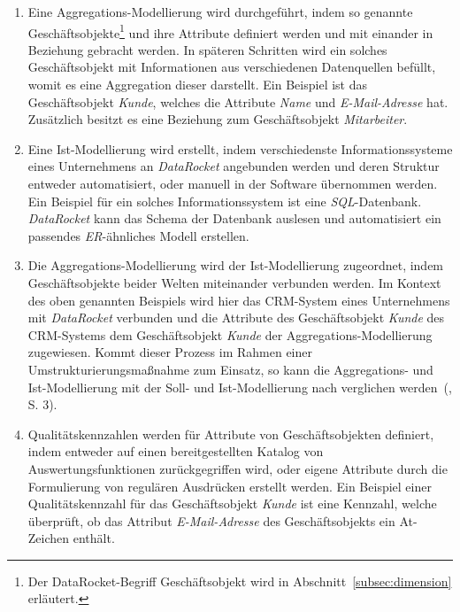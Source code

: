 \documentclass[
  language=german, %
  type=bachelor%
]{isthesis}
\begin{document}
\begin{content}
	\begin{enumerate}
		\item Eine Aggregations-Modellierung wird durchgeführt, indem so genannte
		Geschäftsobjekte\footnote{Der DataRocket-Begriff Geschäftsobjekt wird in
		Abschnitt~\ref{subsec:dimension} erläutert.} und ihre Attribute definiert
		werden und mit einander in Beziehung gebracht werden. In späteren Schritten
		wird ein solches Geschäftsobjekt mit Informationen aus verschiedenen
		Datenquellen befüllt, womit es eine Aggregation dieser darstellt. Ein
		Beispiel ist das Geschäftsobjekt \textit{Kunde}, welches die Attribute
		\textit{Name} und \textit{E-Mail-Adresse} hat. Zusätzlich besitzt es eine
		Beziehung zum Geschäftsobjekt \textit{Mitarbeiter}. 

    \item Eine Ist-Modellierung wird erstellt, indem verschiedenste
      Informationssysteme eines Unternehmens an \textit{DataRocket} angebunden
      werden und deren Struktur entweder automatisiert, oder manuell in der
			Software übernommen werden. Ein Beispiel für ein solches
			Informationssystem ist eine \textit{SQL}-Datenbank. \textit{DataRocket}
			kann das Schema der Datenbank auslesen und automatisiert ein passendes
			\textit{\acrshort{ER}}-ähnliches Modell erstellen.

		\item Die Aggregations-Modellierung wird der Ist-Modellierung zugeordnet,
		indem Geschäftsobjekte beider Welten miteinander verbunden werden. Im
		Kontext des oben genannten Beispiels wird hier das \acrshort{CRM}-System
		eines Unternehmens mit \textit{DataRocket} verbunden und die Attribute des
		Geschäftsobjekt \textit{Kunde} des \acrshort{CRM}-Systems dem
		Geschäftsobjekt \textit{Kunde} der Aggregations-Modellierung zugewiesen.
		Kommt dieser Prozess \zB{} im Rahmen einer Umstrukturierungsmaßnahme
		zum Einsatz, so kann die Aggregations- und Ist-Modellierung mit der Soll-
		und Ist-Modellierung nach \textsc{\citeauthor{becker2006konzeptionelle}}
		verglichen werden~(\citeyear{becker2006konzeptionelle}, S. 3).

		\item Qualitätskennzahlen werden für Attribute von Geschäftsobjekten
		definiert, indem entweder auf einen bereitgestellten Katalog von
		Auswertungsfunktionen zurückgegriffen wird, oder eigene Attribute durch die
		Formulierung von regulären Ausdrücken erstellt werden. Ein Beispiel einer
		Qualitätskennzahl für das Geschäftsobjekt \textit{Kunde} ist eine Kennzahl,
		welche überprüft, ob das Attribut \textit{E-Mail-Adresse} des
		Geschäftsobjekts ein At-Zeichen enthält.


\end{enumerate}
\end{content}
\end{document}
